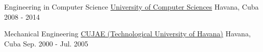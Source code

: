 
\begin{cventries}

  \cventry
    {Engineering in Computer Science} %
    {\faUniversity \hphantom{-} \href{https://www.uci.cu/}{University of Computer Sciences}} %
    {Havana, Cuba} %
    {2008 - 2014} %
    {
      \begin{cvitems} %
      \end{cvitems}
    }

  \cventry
    {Mechanical Engineering} %
    {\faUniversity \hphantom{-} \href{http://cujae.edu.cu/}{CUJAE (Technological University of Havana)}} %
    {Havana, Cuba} %
    {Sep. 2000 - Jul. 2005} %
    {
      \begin{cvitems} %
      \end{cvitems}
    }

\end{cventries}
